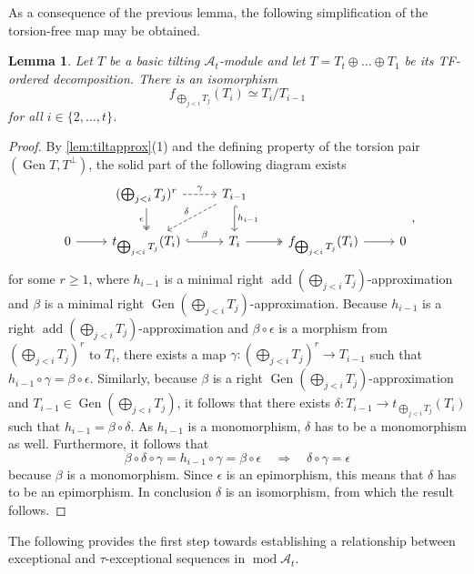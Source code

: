 \documentclass[10pt,twoside, a4paper,reqno]{amsart}
\DeclareMathOperator{\mods}{mod}
\DeclareMathOperator{\add}{add}
\DeclareMathOperator{\Gen}{Gen}
\newcommand{\A}{\mathscr{A}}
\newtheorem{lemma}[theorem]{Lemma}
\theoremstyle{definition}
\begin{document}
As a consequence of the previous lemma, the following simplification of the torsion-free map may be obtained.
\begin{lemma}\label{lem:torfdesc}
	Let $T$ be a basic tilting $\A_t$-module and let $T= T_t \oplus \dots \oplus T_1$ be its TF-ordered decomposition. There is an isomorphism
	\[ f_{\bigoplus_{j<i} T_j} (T_i) \simeq T_i/T_{i-1} \]
	for all $i \in \{2, \dots, t\}$.
\end{lemma}
\begin{proof}
	By \cref{lem:tiltapprox}(1) and the defining property of the torsion pair $(\Gen T, T^\perp)$, the solid part of the following diagram exists
	\[
	\begin{tikzcd}
	& ( \bigoplus_{j <i } T_j)^r \arrow[d, twoheadrightarrow, "\epsilon", swap] \arrow[r, "\gamma", dashed] & T_{i-1} \arrow[d, "h_{i-1}", hookrightarrow] \arrow[ld, "\delta",swap, dashed] \\
	0 \arrow[r] & t_{\bigoplus_{j<i} T_j} (T_i) \arrow[r, "\beta", hookrightarrow] & T_i \arrow[r, twoheadrightarrow] &f_{\bigoplus_{j<i} T_j} (T_i) \arrow[r] & 0 
	\end{tikzcd},
	\] 
	for some $r \geq 1$, where $h_{i-1}$ is a minimal right $\add (\bigoplus_{j<i} T_j)$-approximation and $\beta$ is a minimal right $\Gen(\bigoplus_{j<i} T_j)$-approximation. Because $h_{i-1}$ is a right $\add (\bigoplus_{j<i} T_j)$-approximation and $\beta \circ \epsilon$ is a morphism from $(\bigoplus_{j<i} T_j)^r$ to $T_i$, there exists a map $\gamma: (\bigoplus_{j<i} T_j)^r \to T_{i-1}$ such that $h_{i-1} \circ \gamma = \beta \circ \epsilon$. Similarly, because $\beta$ is a right $\Gen(\bigoplus_{j<i} T_j)$-approximation and $T_{i-1} \in \Gen(\bigoplus_{j<i} T_j)$, it follows that there exists $\delta: T_{i-1} \to t_{\bigoplus_{j<i} T_j} (T_i)$ such that $h_{i-1} = \beta \circ \delta$. As $h_{i-1}$ is a monomorphism, $\delta$ has to be a monomorphism as well. Furthermore, it follows that
	\[ \beta \circ \delta \circ \gamma = h_{i-1} \circ \gamma = \beta \circ \epsilon \quad \Longrightarrow \quad \delta \circ \gamma = \epsilon \]
	because $\beta$ is a monomorphism. Since $\epsilon$ is an epimorphism, this means that $\delta$ has to be an epimorphism. In conclusion $\delta$ is an isomorphism, from which the result follows.
\end{proof}

The following provides the first step towards establishing a relationship between exceptional and $\tau$-exceptional sequences in $\mods \A_t$.
\end{document}
